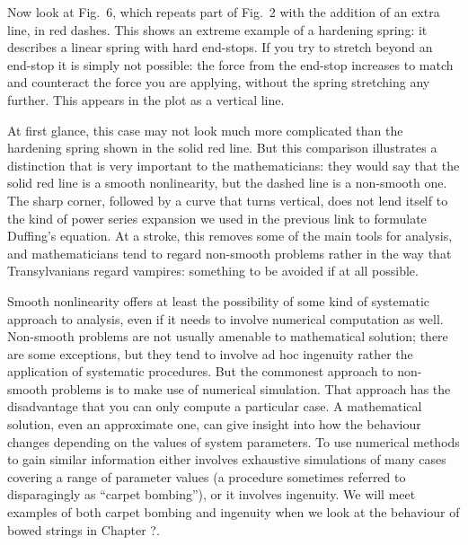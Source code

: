 
  Now look at Fig.\ 6, which repeats part of Fig.\ 2 with the addition of an 
  extra line, in red dashes. This shows an extreme example of a hardening 
  spring: it describes a linear spring with hard end-stops. If you try to 
  stretch beyond an end-stop it is simply not possible: the force from the 
  end-stop increases to match and counteract the force you are applying, 
  without the spring stretching any further. This appears in the plot as a 
  vertical line. 


  At first glance, this case may not look much more complicated than the 
  hardening spring shown in the solid red line. But this comparison illustrates 
  a distinction that is very important to the mathematicians: they would say 
  that the solid red line is a smooth nonlinearity, but the dashed line is a 
  non-smooth one. The sharp corner, followed by a curve that turns vertical, 
  does not lend itself to the kind of power series expansion we used in the 
  previous link to formulate Duffing’s equation. At a stroke, this removes some 
  of the main tools for analysis, and mathematicians tend to regard non-smooth 
  problems rather in the way that Transylvanians regard vampires: something to 
  be avoided if at all possible. 

  Smooth nonlinearity offers at least the possibility of some kind of 
  systematic approach to analysis, even if it needs to involve numerical 
  computation as well. Non-smooth problems are not usually amenable to 
  mathematical solution; there are some exceptions, but they tend to involve ad 
  hoc ingenuity rather the application of systematic procedures. But the 
  commonest approach to non-smooth problems is to make use of numerical 
  simulation. That approach has the disadvantage that you can only compute a 
  particular case. A mathematical solution, even an approximate one, can give 
  insight into how the behaviour changes depending on the values of system 
  parameters. To use numerical methods to gain similar information either 
  involves exhaustive simulations of many cases covering a range of parameter 
  values (a procedure sometimes referred to disparagingly as “carpet bombing”), 
  or it involves ingenuity. We will meet examples of both carpet bombing and 
  ingenuity when we look at the behaviour of bowed strings in Chapter ?. 

